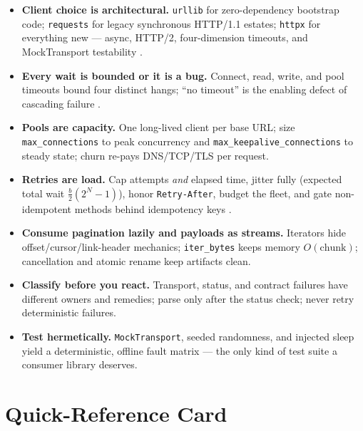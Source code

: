 \begin{itemize}
  \item \textbf{Client choice is architectural.} \texttt{urllib} for
        zero-dependency bootstrap code; \texttt{requests} for legacy
        synchronous HTTP/1.1 estates; \texttt{httpx} for everything new ---
        async, HTTP/2, four-dimension timeouts, and MockTransport testability
        \cite{httpxdocs,requestsdocs}.
  \item \textbf{Every wait is bounded or it is a bug.} Connect, read, write,
        and pool timeouts bound four distinct hangs; ``no timeout'' is the
        enabling defect of cascading failure \cite{nygard2018releaseit}.
  \item \textbf{Pools are capacity.} One long-lived client per base URL;
        size \texttt{max\_connections} to peak concurrency and
        \texttt{max\_keepalive\_connections} to steady state; churn re-pays
        DNS/TCP/TLS per request.
  \item \textbf{Retries are load.} Cap attempts \emph{and} elapsed time,
        jitter fully (expected total wait $\frac{b}{2}(2^N - 1)$), honor
        \texttt{Retry-After}, budget the fleet, and gate non-idempotent
        methods behind idempotency keys \cite{rfc9110}.
  \item \textbf{Consume pagination lazily and payloads as streams.}
        Iterators hide offset/cursor/link-header mechanics;
        \texttt{iter\_bytes} keeps memory $O(\text{chunk})$; cancellation
        and atomic rename keep artifacts clean.
  \item \textbf{Classify before you react.} Transport, status, and contract
        failures have different owners and remedies; parse only after the
        status check; never retry deterministic failures.
  \item \textbf{Test hermetically.} \texttt{MockTransport}, seeded
        randomness, and injected sleep yield a deterministic, offline fault
        matrix --- the only kind of test suite a consumer library deserves.
\end{itemize}


\section{Quick-Reference Card}
\label{sec:ch02-quickref}

